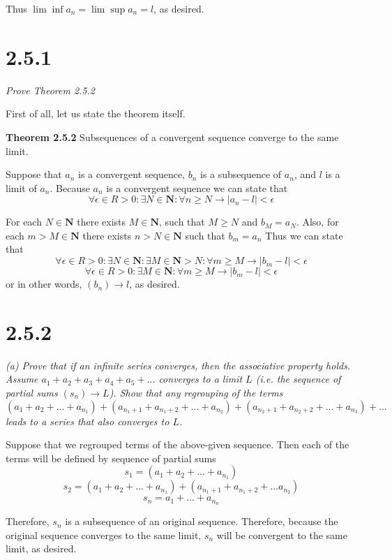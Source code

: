 \documentclass[11pt,oneside,titlepage]{article}
\begin{document}
Thus $\lim \inf a_n = \lim \sup a_n = l$, as desired.

\section*{2.5.1}
\textit{Prove Theorem 2.5.2}

First of all, let us state the theorem itself.

\textbf{Theorem 2.5.2}
Subsequences of a convergent sequence converge to the same limit.

Suppose that $a_n$ is a convergent sequence,  $b_n$ is  a subsequence of
$a_n$, and $l$ is a limit of $a_n$.  Because $a_n$ is a convergent sequence
we can state that 
$$\forall \epsilon \in R > 0: \exists N \in \textbf{N}: \forall n \geq N \to
|a_n - l| < \epsilon$$

For each $N \in \textbf{N}$ there exists $M \in \textbf{N}$, such that
$M \geq N$ and  $b_M = a_N$. Also, for each $m > M \in \textbf{N}$ there exists
$n > N \in \textbf{N}$ such that $b_m = a_n$
Thus we can state that 
$$\forall \epsilon \in R > 0: \exists N \in \textbf{N}: \exists M \in \textbf{N} > N:  \forall m \geq M \to |b_m - l| < \epsilon$$
$$\forall \epsilon \in R > 0:  \exists M \in \textbf{N} :  \forall m \geq M \to |b_m - l| < \epsilon$$
or in other words, $(b_n) \to l$, as desired.

\section*{2.5.2}
\textit{(a) Prove that if an infinite series converges, then the associative
  property holds. Assume $a_1 + a_2 + a_3 + a_4 + a_5 + ...$ converges
  to a limit $L$ (i.e. the sequence of partial sums $(s_n) \to L$). Show that
  any regrouping of the terms}
$$(a_1 + a_2 + ... + a_{n_1}) + (a_{n_1 + 1} + a_{n_1 + 2} + ... + a_{n_2}) +
(a_{n_2 + 1} + a_{n_2 + 2} + ... + a_{n_3}) + ...$$
\textit{leads to a series that also converges to $L$.}

Suppose that we regrouped terms of the above-given sequence. Then each
of the terms will be defined by sequence of partial sums
$$s_1 = (a_1 + a_2 + ... + a_{n_1})$$
$$s_2 = (a_1 + a_2 + ... + a_{n_1}) + (a_{n_1 + 1} + a_{n_1 + 2 } + ... a_{n_2})$$
$$s_n = a_1 + ... + a_{n_n}$$

Therefore, $s_n$ is a subsequence of an original sequence. 
Therefore, because the original sequence converges to the same limit,
$s_n$ will be convergent to the same limit, as desired.
\end{document}
